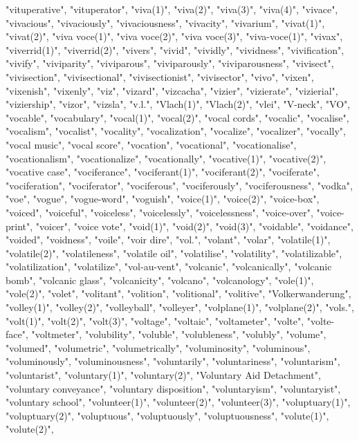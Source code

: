 "vituperative",
"vituperator",
"viva(1)",
"viva(2)",
"viva(3)",
"viva(4)",
"vivace",
"vivacious",
"vivaciously",
"vivaciousness",
"vivacity",
"vivarium",
"vivat(1)",
"vivat(2)",
"viva voce(1)",
"viva voce(2)",
"viva voce(3)",
"viva-voce(1)",
"vivax",
"viverrid(1)",
"viverrid(2)",
"vivers",
"vivid",
"vividly",
"vividness",
"vivification",
"vivify",
"viviparity",
"viviparous",
"viviparously",
"viviparousness",
"vivisect",
"vivisection",
"vivisectional",
"vivisectionist",
"vivisector",
"vivo",
"vixen",
"vixenish",
"vixenly",
"viz",
"vizard",
"vizcacha",
"vizier",
"vizierate",
"vizierial",
"viziership",
"vizor",
"vizsla",
"v.l.",
"Vlach(1)",
"Vlach(2)",
"vlei",
"V-neck",
"VO",
"vocable",
"vocabulary",
"vocal(1)",
"vocal(2)",
"vocal cords",
"vocalic",
"vocalise",
"vocalism",
"vocalist",
"vocality",
"vocalization",
"vocalize",
"vocalizer",
"vocally",
"vocal music",
"vocal score",
"vocation",
"vocational",
"vocationalise",
"vocationalism",
"vocationalize",
"vocationally",
"vocative(1)",
"vocative(2)",
"vocative case",
"vociferance",
"vociferant(1)",
"vociferant(2)",
"vociferate",
"vociferation",
"vociferator",
"vociferous",
"vociferously",
"vociferousness",
"vodka",
"voe",
"vogue",
"vogue-word",
"voguish",
"voice(1)",
"voice(2)",
"voice-box",
"voiced",
"voiceful",
"voiceless",
"voicelessly",
"voicelessness",
"voice-over",
"voice-print",
"voicer",
"voice vote",
"void(1)",
"void(2)",
"void(3)",
"voidable",
"voidance",
"voided",
"voidness",
"voile",
"voir dire",
"vol.",
"volant",
"volar",
"volatile(1)",
"volatile(2)",
"volatileness",
"volatile oil",
"volatilise",
"volatility",
"volatilizable",
"volatilization",
"volatilize",
"vol-au-vent",
"volcanic",
"volcanically",
"volcanic bomb",
"volcanic glass",
"volcanicity",
"volcano",
"volcanology",
"vole(1)",
"vole(2)",
"volet",
"volitant",
"volition",
"volitional",
"volitive",
"Volkerwanderung",
"volley(1)",
"volley(2)",
"volleyball",
"volleyer",
"volplane(1)",
"volplane(2)",
"vols.",
"volt(1)",
"volt(2)",
"volt(3)",
"voltage",
"voltaic",
"voltameter",
"volte",
"volte-face",
"voltmeter",
"volubility",
"voluble",
"volubleness",
"volubly",
"volume",
"volumed",
"volumetric",
"volumetrically",
"voluminosity",
"voluminous",
"voluminously",
"voluminousness",
"voluntarily",
"voluntariness",
"voluntarism",
"voluntarist",
"voluntary(1)",
"voluntary(2)",
"Voluntary Aid Detachment",
"voluntary conveyance",
"voluntary disposition",
"voluntaryism",
"voluntaryist",
"voluntary school",
"volunteer(1)",
"volunteer(2)",
"volunteer(3)",
"voluptuary(1)",
"voluptuary(2)",
"voluptuous",
"voluptuously",
"voluptuousness",
"volute(1)",
"volute(2)",
